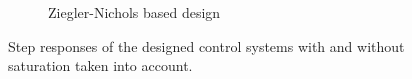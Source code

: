 \documentclass[../../main.tex]{subfiles}
\begin{document}
\begin{figure}[h]
\begin{subfigure}{0.48\textwidth}
    \caption{Ziegler-Nichols based design}
    \label{fig:step_vel_ZN}
\end{subfigure}
\caption{Step responses of the designed control systems with and without saturation taken into account.}
\label{fig:vel_step}
\end{figure}



\end{document}

